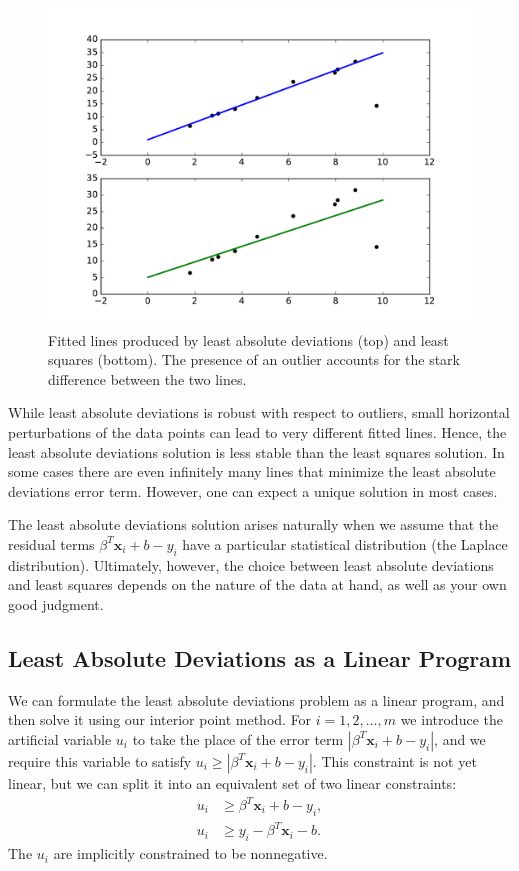 \begin{figure}
\centering
\includegraphics[width=\textwidth]{leastAbsDev.pdf}
\caption{Fitted lines produced by least absolute deviations (top) and least squares (bottom). The presence of an outlier accounts for the
stark difference between the two lines.}
\label{fig:leastAbsDev}
\end{figure}

While least absolute deviations is robust with respect to outliers, small horizontal perturbations of the data points can lead to very different fitted lines.
Hence, the least absolute deviations solution is less stable than the least squares solution.
In some cases there are even infinitely many lines that minimize the least absolute deviations error term.
However, one can expect a unique solution in most cases.

The least absolute deviations solution arises naturally when we assume that the residual terms $\beta^T\mathbf{x}_i + b - y_i$ have a particular statistical distribution (the Laplace distribution).
Ultimately, however, the choice between least absolute deviations and least squares depends on the nature of the data at hand, as well as your own good judgment.

\subsection{Least Absolute Deviations as a Linear Program}
We can formulate the least absolute deviations problem as a linear program, and then solve it using our interior point method.
For $i = 1, 2, \ldots, m$ we introduce the artificial variable $u_i$ to take the place of the error term $|\beta^T\mathbf{x}_i + b - y_i|$, and we require this variable to satisfy $u_i \geq |\beta^T\mathbf{x}_i + b - y_i|$.
This constraint is not yet linear, but we can split it into an equivalent set of two linear constraints:
\begin{align*}
u_i &\geq \beta^T\mathbf{x}_i + b - y_i,\\
u_i &\geq y_i - \beta^T\mathbf{x}_i - b.
\end{align*}
The $u_i$ are implicitly constrained to be nonnegative.

